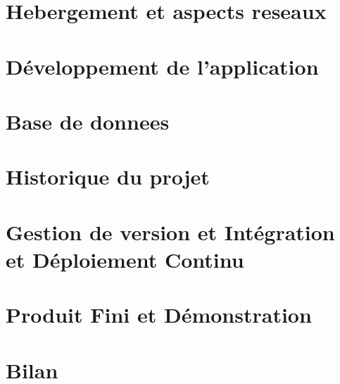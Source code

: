 \documentclass[12pt, a4paper, oneside]{article}
\begin{document}
    \section{Hebergement et aspects reseaux}\label{sec:hebergement-et-aspects-reseaux}
    
    \newpage


    \section{Développement de l'application}\label{sec:developpement-de-l'application}
    
    \newpage


    \section{Base de donnees}\label{sec:base-de-donnees}
    
    \newpage


    \section{Historique du projet}\label{sec:historique-du-projet}
    
    \newpage


    \section{Gestion de version et Intégration et Déploiement Continu}\label{sec:gestion-de-version-et-integration/-deploiement-continu}
    
    \newpage


    \section{Produit Fini et Démonstration}\label{sec:produit-fini-et-demonstration}
    
    \newpage


    \section{Bilan}\label{sec:bilan}
    
%
%





    \newpage
\end{document}
